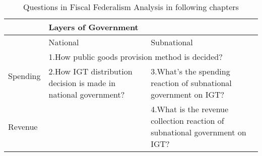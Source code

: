 \clearpage
\begin{table}[htbp]
    \centering
    \caption{Questions in Fiscal Federalism Analysis in following chapters}
    \begin{tabular}{|p{4.215em}|l|p{16.5em}|}
        \hline
        \multicolumn{1}{|c|}{}                & \multicolumn{2}{p{30.5em}|}{Layers of Government}                                                                                                                                  \\
        \hline
        \multicolumn{1}{|c|}{}                & \multicolumn{1}{p{14em}|}{National }                                                       & Subnational                                                                           \\
        \hline
        \multirow{2}[4]{*}{Spending}          & \multicolumn{2}{p{30.5em}|}{1.How public goods provision method is decided?}                                                                                                       \\
        \cline{2-3}    \multicolumn{1}{|c|}{} & \multicolumn{1}{p{14em}|}{2.How IGT distribution decision is made in national government?} & 3.What's the spending reaction of subnational government on IGT?                      \\
        \hline
        Revenue                               &                                                                                            & 4.What is the revenue collection reaction of subnational government on IGT?\newline{} \\
        \hline
    \end{tabular}%
    \label{Table 1.5}%
\end{table}%


